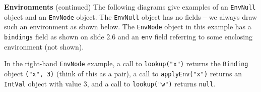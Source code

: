 \begin{minipage}[t]{\sw}
\slidenumber
\LARGE
{\bf Environments} (continued)\exx
The following diagrams give examples of 
an \verb'EnvNull' object and an \verb'EnvNode' object.\exx
The \verb'EnvNull' object has no fields --
we always draw such an environment as shown below.
The \verb'EnvNode' object in this example has
a \verb'bindings' field as shown on slide 2.6
and an \verb'env' field referring to some enclosing environment (not shown).\exx
\centerline{}\exx
In the right-hand \verb'EnvNode' example,
a call to \verb'lookup("x")' returns
the \verb'Binding' object \verb'("x", 3)'
(think of this as a pair),
a call to \verb'applyEnv("x")' returns
an \verb'IntVal' object with value 3,
and a call to \verb'lookup("w")' returns \verb'null'.
\end{minipage}
\clearpage

